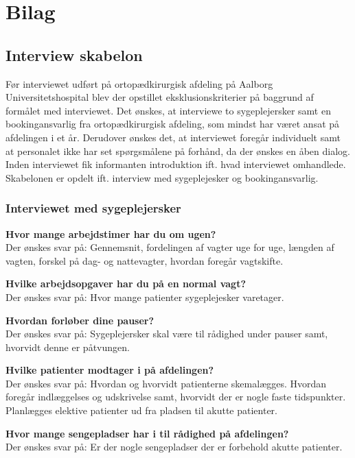 \chapter{Bilag}

\section{Interview skabelon} \label{bilagA}
Før interviewet udført på ortopædkirurgisk afdeling på Aalborg Universitetshospital blev der opstillet eksklusionskriterier på baggrund af formålet med interviewet. Det ønskes, at interviewe to sygeplejersker samt en bookingansvarlig fra ortopædkirurgisk afdeling, som mindst har været ansat på afdelingen i et år. Derudover ønskes det, at interviewet foregår individuelt samt at personalet ikke har set spørgsmålene på forhånd, da der ønskes en åben dialog. Inden interviewet fik informanten introduktion ift. hvad interviewet omhandlede. Skabelonen er opdelt ift. interview med sygeplejesker og bookingansvarlig. 

\subsection{Interviewet med sygeplejersker}
\textbf{Hvor mange arbejdstimer har du om ugen?} \\
\noindent
Der ønskes svar på: Gennemsnit, fordelingen af vagter uge for uge, længden af vagten, forskel på dag- og nattevagter, hvordan foregår vagtskifte. 

\noindent
\textbf{Hvilke arbejdsopgaver har du på en normal vagt?} \\
\noindent
Der ønskes svar på: Hvor mange patienter sygeplejesker varetager. 

\noindent
\textbf{Hvordan forløber dine pauser?} \\
\noindent
Der ønskes svar på: Sygeplejersker skal være til rådighed under pauser samt, hvorvidt denne er påtvungen. 

\noindent
\textbf{Hvilke patienter modtager i på afdelingen?} \\
\noindent
Der ønskes svar på: Hvordan og hvorvidt patienterne skemalægges. Hvordan foregår indlæggelses og udskrivelse samt, hvorvidt der er nogle faste tidspunkter. Planlægges elektive patienter ud fra pladsen til akutte patienter.  

\noindent
\textbf{Hvor mange sengepladser har i til rådighed på afdelingen?}  \\
\noindent
Der ønskes svar på: Er der nogle sengepladser der er forbehold akutte patienter.


